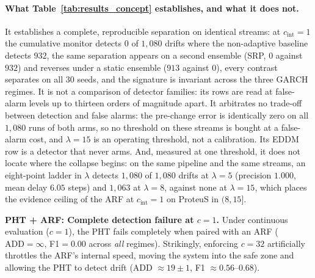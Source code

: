 \documentclass[smallextended]{svjour3}
\newcommand{\LambdaFA}{15}                   %
\begin{document}
\paragraph{What Table~\ref{tab:results_concept} establishes, and what it does not.}
It establishes a complete, reproducible separation on identical streams: at $c_{\mathrm{int}} = 1$ the cumulative monitor detects $0$ of $1{,}080$ drifts where the non-adaptive baseline detects $932$, the same separation appears on a second ensemble (SRP, $0$ against $932$) and reverses under a static ensemble ($913$ against $0$), every contrast separates on all $30$ seeds, and the signature is invariant across the three GARCH regimes. It is not a comparison of detector families: its rows are read at false-alarm levels up to thirteen orders of magnitude apart. It arbitrates no trade-off between detection and false alarms: the pre-change error is identically zero on all $1{,}080$ runs of both arms, so no threshold on these streams is bought at a false-alarm cost, and $\lambda = \LambdaFA$ is an operating threshold, not a calibration. Its EDDM row is a detector that never arms. And, measured at one threshold, it does not locate where the collapse begins: on the same pipeline and the same streams, an eight-point ladder in $\lambda$ detects $1{,}080$ of $1{,}080$ drifts at $\lambda = 5$ (precision $1.000$, mean delay $6.05$ steps) and $1{,}063$ at $\lambda = 8$, against none at $\lambda = 15$, which places the evidence ceiling of the ARF at $c_{\mathrm{int}} = 1$ on ProteuS in $(8, 15]$.

\textbf{PHT + ARF: Complete detection failure at $c{=}1$.}
Under continuous evaluation ($c{=}1$), the PHT fails completely when paired with an ARF ($\mathrm{ADD}{=}\infty$, F1${=}0.00$ across \emph{all} regimes).
Strikingly, enforcing $c{=}32$ artificially throttles the ARF's internal speed, moving the system into the safe zone and allowing the PHT to detect drift (ADD ${\approx}19{\pm}1$, F1 ${\approx}0.56$--$0.68$).
\end{document}
